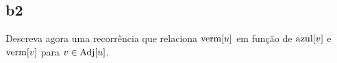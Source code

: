 \subsection{b2}

Descreva agora uma recorrência que relaciona $\mathrm{verm}[u]$ em função de $\mathrm{azul}[v]$ e $\mathrm{verm}[v]$ para $v \in \operatorname{Adj}[u]$.

\itemdsep[0.25]
